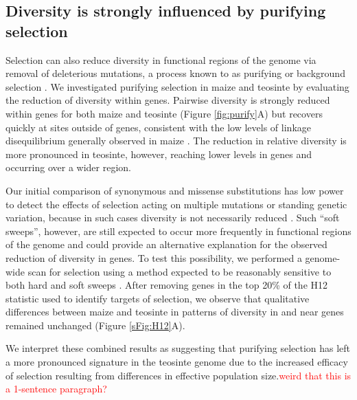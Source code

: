 \documentclass{pnastwo}
\newcommand{\jri}[1]{\textcolor{red}{\scriptsize #1}}
\begin{document}
\begin{article}
\subsection{Diversity is strongly influenced by purifying selection}

Selection can also reduce diversity in functional regions of the genome via removal of deleterious mutations, a process known to as purifying or background selection \cite{charlesworth1993}.
We investigated purifying selection in maize and teosinte by evaluating the reduction of diversity within genes.
Pairwise diversity is strongly reduced within genes for both maize and teosinte (Figure \ref{fig:purify}A) but recovers quickly at sites outside of genes, consistent with the low levels of linkage disequilibrium generally observed in maize \cite{tenaillon2002,chia2012}. 
The reduction in relative diversity is more pronounced in teosinte, however, reaching lower levels in genes and occurring over a wider region.  

Our initial comparison of synonymous and missense substitutions has low power to detect the effects of selection acting on multiple mutations or standing genetic variation, because in such cases diversity is not necessarily reduced \cite{innan2004,messer2013}. 
Such ``soft sweeps'', however, are still expected to occur more frequently in functional regions of the genome and could provide an alternative explanation for the observed reduction of diversity in genes. 
To test this possibility, we performed a genome-wide scan for selection using a method expected to be reasonably sensitive to both hard and soft sweeps \cite{garud2015}. 
After removing genes in the top 20\% of the H12 statistic used to identify targets of selection, we observe that qualitative differences between maize and teosinte in patterns of diversity in and near genes remained unchanged (Figure \ref{sFig:H12}A).

We interpret these combined results as suggesting that purifying selection has left a more pronounced signature in the teosinte genome due to the increased efficacy of selection resulting from differences in effective population size.\jri{weird that this is a 1-sentence paragraph?} 


\end{article}
\end{document}
